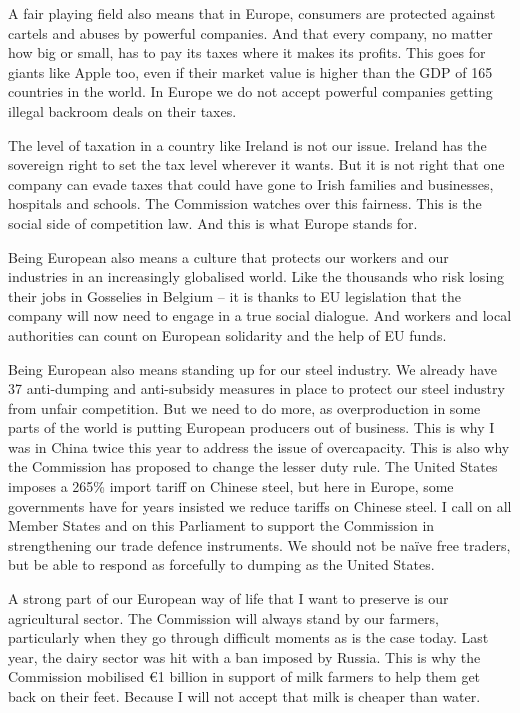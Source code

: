 \documentclass[a4paper,11pt]{article}
\begin{document}
A fair playing field also means that in Europe, consumers are protected against cartels and abuses by powerful companies. And that every company, no matter how big or small, has to pay its taxes where it makes its profits. This goes for giants like Apple too, even if their market value is higher than the GDP of 165 countries in the world. In Europe we do not accept powerful companies getting illegal backroom deals on their taxes.

The level of taxation in a country like Ireland is not our issue. Ireland has the sovereign right to set the tax level wherever it wants. But it is not right that one company can evade taxes that could have gone to Irish families and businesses, hospitals and schools. The Commission watches over this fairness. This is the social side of competition law. And this is what Europe stands for.

Being European also means a culture that protects our workers and our industries in an increasingly globalised world. Like the thousands who risk losing their jobs in Gosselies in Belgium – it is thanks to EU legislation that the company will now need to engage in a true social dialogue. And workers and local authorities can count on European solidarity and the help of EU funds.

Being European also means standing up for our steel industry. We already have 37 anti-dumping and anti-subsidy measures in place to protect our steel industry from unfair competition. But we need to do more, as overproduction in some parts of the world is putting European producers out of business. This is why I was in China twice this year to address the issue of overcapacity. This is also why the Commission has proposed to change the lesser duty rule. The United States imposes a 265\% import tariff on Chinese steel, but here in Europe, some governments have for years insisted we reduce tariffs on Chinese steel. I call on all Member States and on this Parliament to support the Commission in strengthening our trade defence instruments. We should not be naïve free traders, but be able to respond as forcefully to dumping as the United States.

A strong part of our European way of life that I want to preserve is our agricultural sector. The Commission will always stand by our farmers, particularly when they go through difficult moments as is the case today. Last year, the dairy sector was hit with a ban imposed by Russia. This is why the Commission mobilised \euro1 billion in support of milk farmers to help them get back on their feet. Because I will not accept that milk is cheaper than water.
\end{document}
